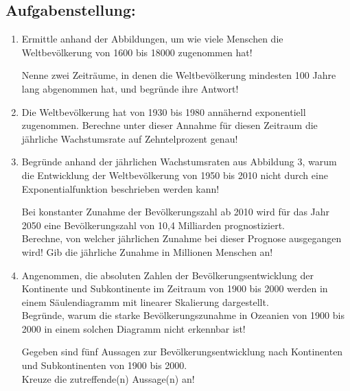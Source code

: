 \begin{langesbeispiel}
\subsection{Aufgabenstellung:}
\begin{enumerate}
	\item Ermittle anhand der Abbildungen, um wie viele Menschen die Weltbevölkerung von 1600 bis 18000 zugenommen hat!
	
	Nenne zwei Zeiträume, in denen die Weltbevölkerung mindesten 100 Jahre lang abgenommen hat, und begründe ihre Antwort!
	
	\item Die Weltbevölkerung hat von 1930 bis 1980 annähernd exponentiell zugenommen. Berechne unter dieser Annahme für diesen Zeitraum die jährliche Wachstumsrate auf Zehntelprozent genau!
	
	\item Begründe anhand der jährlichen Wachstumsraten aus Abbildung 3, warum die Entwicklung der Weltbevölkerung von 1950 bis 2010 nicht durch eine Exponentialfunktion beschrieben werden kann!
	
Bei konstanter Zunahme der Bevölkerungszahl ab 2010 wird für das Jahr 2050 eine Bevölkerungszahl von 10,4 Milliarden prognostiziert.\\
Berechne, von welcher jährlichen Zunahme bei dieser Prognose ausgegangen wird!
Gib die jährliche Zunahme in Millionen Menschen an!

\item Angenommen, die absoluten Zahlen der Bevölkerungsentwicklung der Kontinente und
Subkontinente im Zeitraum von 1900 bis 2000 werden in einem Säulendiagramm mit
linearer Skalierung dargestellt.\\
Begründe, warum die starke Bevölkerungszunahme in Ozeanien von 1900 bis 2000
in einem solchen Diagramm nicht erkennbar ist!

Gegeben sind fünf Aussagen zur Bevölkerungsentwicklung nach Kontinenten und Subkontinenten von 1900 bis 2000.\\
Kreuze die zutreffende(n) Aussage(n) an!\leer

						\end{enumerate}\leer
				

\end{langesbeispiel}
